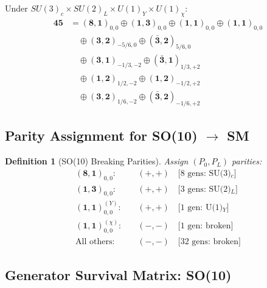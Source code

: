 \documentclass[11pt,a4paper]{article}
\newtheorem{definition}[theorem]{Definition}
\begin{document}
Under $SU(3)_c \times SU(2)_L \times U(1)_Y \times U(1)_\chi$:
\begin{align}
  \mathbf{45} &= (\mathbf{8},\mathbf{1})_{0,0} \oplus (\mathbf{1},\mathbf{3})_{0,0}
    \oplus (\mathbf{1},\mathbf{1})_{0,0} \oplus (\mathbf{1},\mathbf{1})_{0,0}
  \label{eq:so10-sm-1} \\
  &\quad \oplus (\mathbf{3},\mathbf{2})_{-5/6,0} \oplus (\bar{\mathbf{3}},\mathbf{2})_{5/6,0}
  \label{eq:so10-sm-2} \\
  &\quad \oplus (\mathbf{3},\mathbf{1})_{-1/3,-2} \oplus (\bar{\mathbf{3}},\mathbf{1})_{1/3,+2}
  \label{eq:so10-sm-3} \\
  &\quad \oplus (\mathbf{1},\mathbf{2})_{1/2,-2} \oplus (\mathbf{1},\mathbf{2})_{-1/2,+2}
  \label{eq:so10-sm-4} \\
  &\quad \oplus (\mathbf{3},\mathbf{2})_{1/6,-2} \oplus (\bar{\mathbf{3}},\mathbf{2})_{-1/6,+2}
  \label{eq:so10-sm-5}
\end{align}

\subsection{Parity Assignment for SO(10) $\to$ SM}

\begin{definition}[SO(10) Breaking Parities]
\label{def:so10-parity}
Assign $(P_0, P_L)$ parities:
\begin{align}
  (\mathbf{8},\mathbf{1})_{0,0}: & \quad (+,+) \quad \text{[8 gens: SU(3)$_c$]}
  \label{eq:so10-p1} \\
  (\mathbf{1},\mathbf{3})_{0,0}: & \quad (+,+) \quad \text{[3 gens: SU(2)$_L$]}
  \label{eq:so10-p2} \\
  (\mathbf{1},\mathbf{1})_{0,0}^{(Y)}: & \quad (+,+) \quad \text{[1 gen: U(1)$_Y$]}
  \label{eq:so10-p3} \\
  (\mathbf{1},\mathbf{1})_{0,0}^{(\chi)}: & \quad (-,-) \quad \text{[1 gen: broken]}
  \label{eq:so10-p4} \\
  \text{All others}: & \quad (-,-) \quad \text{[32 gens: broken]}
  \label{eq:so10-p5}
\end{align}
\end{definition}

\subsection{Generator Survival Matrix: SO(10)}
\end{document}
